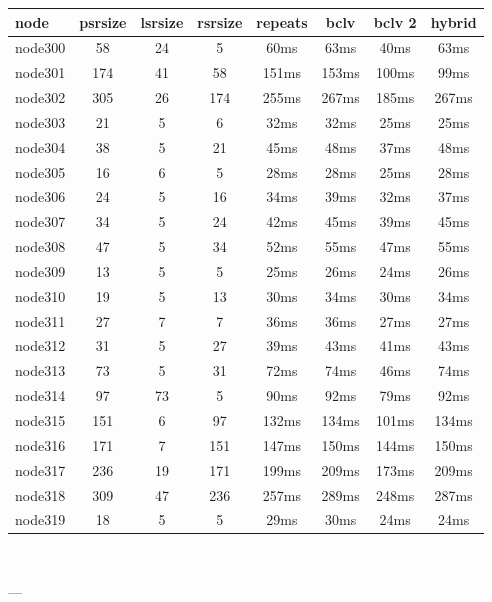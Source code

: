 \begin{tabular}{|l|c|c|c|c|c|c|c|}
\hline node & psrsize & lsrsize & rsrsize   & repeats & bclv & bclv 2 & hybrid\\
    \hline node300 & 58 & 24 & 5 & 60ms & 63ms & 40ms & 63ms\\
    \hline node301 & 174 & 41 & 58 & 151ms & 153ms & 100ms & 99ms\\
    \hline node302 & 305 & 26 & 174 & 255ms & 267ms & 185ms & 267ms\\
    \hline node303 & 21 & 5 & 6 & 32ms & 32ms & 25ms & 25ms\\
    \hline node304 & 38 & 5 & 21 & 45ms & 48ms & 37ms & 48ms\\
    \hline node305 & 16 & 6 & 5 & 28ms & 28ms & 25ms & 28ms\\
    \hline node306 & 24 & 5 & 16 & 34ms & 39ms & 32ms & 37ms\\
    \hline node307 & 34 & 5 & 24 & 42ms & 45ms & 39ms & 45ms\\
    \hline node308 & 47 & 5 & 34 & 52ms & 55ms & 47ms & 55ms\\
    \hline node309 & 13 & 5 & 5 & 25ms & 26ms & 24ms & 26ms\\
    \hline node310 & 19 & 5 & 13 & 30ms & 34ms & 30ms & 34ms\\
    \hline node311 & 27 & 7 & 7 & 36ms & 36ms & 27ms & 27ms\\
    \hline node312 & 31 & 5 & 27 & 39ms & 43ms & 41ms & 43ms\\
    \hline node313 & 73 & 5 & 31 & 72ms & 74ms & 46ms & 74ms\\
    \hline node314 & 97 & 73 & 5 & 90ms & 92ms & 79ms & 92ms\\
    \hline node315 & 151 & 6 & 97 & 132ms & 134ms & 101ms & 134ms\\
    \hline node316 & 171 & 7 & 151 & 147ms & 150ms & 144ms & 150ms\\
    \hline node317 & 236 & 19 & 171 & 199ms & 209ms & 173ms & 209ms\\
    \hline node318 & 309 & 47 & 236 & 257ms & 289ms & 248ms & 287ms\\
    \hline node319 & 18 & 5 & 5 & 29ms & 30ms & 24ms & 24ms\\

\hline
\end{tabular} \

---


